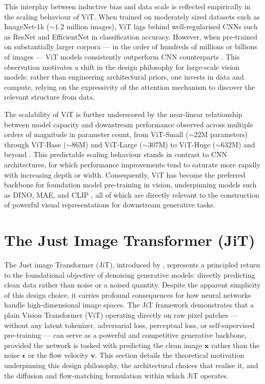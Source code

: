This interplay between inductive bias and data scale is reflected empirically in the scaling behaviour of ViT. When trained on moderately sized datasets such as ImageNet-1k (${\sim}1.2$ million images), ViT lags behind well-regularised CNNs such as ResNet and EfficientNet \cite{he2016deep, tan2019efficientnet} in classification accuracy. However, when pre-trained on substantially larger corpora — in the order of hundreds of millions or billions of images — ViT models consistently outperform CNN counterparts \cite{dosovitskiy2020image, zhai2022scaling}. This observation motivates a shift in the design philosophy for large-scale vision models: rather than engineering architectural priors, one invests in data and compute, relying on the expressivity of the attention mechanism to discover the relevant structure from data.

The scalability of ViT is further underscored by the near-linear relationship between model capacity and downstream performance observed across multiple orders of magnitude in parameter count, from ViT-Small (${\sim}22$M parameters) through ViT-Base (${\sim}86$M) and ViT-Large (${\sim}307$M) to ViT-Huge (${\sim}632$M) and beyond \cite{zhai2022scaling}. This predictable scaling behaviour stands in contrast to CNN architectures, for which performance improvements tend to saturate more rapidly with increasing depth or width. Consequently, ViT has become the preferred backbone for foundation model pre-training in vision, underpinning models such as DINO, MAE, and CLIP \cite{radford2021learning}, all of which are directly relevant to the construction of powerful visual representations for downstream generative tasks.


\section{The Just Image Transformer (JiT)}
\label{sec:jit}

The Just image Transformer (JiT), introduced by \cite{li2025jit}, represents a principled return to the foundational objective of denoising generative models: directly predicting clean data rather than noise or a noised quantity. Despite the apparent simplicity of this design choice, it carries profound consequences for how neural networks handle high-dimensional image spaces. The JiT framework demonstrates that a plain Vision Transformer (ViT) operating directly on raw pixel patches — without any latent tokenizer, adversarial loss, perceptual loss, or self-supervised pre-training — can serve as a powerful and competitive generative backbone, provided the network is tasked with predicting the clean image $\bm{x}$ rather than the noise $\bm{\epsilon}$ or the flow velocity $\bm{v}$. This section details the theoretical motivation underpinning this design philosophy, the architectural choices that realise it, and the diffusion and flow-matching formulation within which JiT operates.

